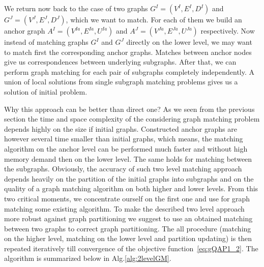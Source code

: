 We return now back to the case of two graphs $G^I=(V^I,E^I,D^I)$ and $G^J=(V^J,E^J,D^J)$, which we want to match. 
For each of them we build an anchor graph $A^I=(V^{Ia},E^{Ia},U^{Ia})$ and $A^J=(V^{Ja},E^{Ja},U^{Ja})$ respectively.
Now instead of matching graphs $G^I$ and $G^J$ directly on the lower level, we may want to match first the corresponding anchor graphs. Matches between anchor nodes give us correspondences between underlying subgraphs. After that, we can perform graph matching for each pair of subgraphs completely independently. A union of local solutions from single subgraph matching problems gives us a solution of initial problem. 

Why this approach can be better than direct one? As we seen from the previous section the time and space complexity of the considering graph matching problem depends highly on the size if initial graphs. Constructed anchor graphs are however several time smaller than initial graphs, which means, the matching algorithm on the anchor level can be performed much faster and without high memory demand then on the lower level. The same holds for matching between the subgraphs.
Obviously, the accuracy of such two level matching approach depends heavily on the partition of the initial graphs into subgraphs and on the quality of a graph matching algorithm on both higher and lower levels. From this two critical moments, we concentrate ourself on the first one and use for graph matching some existing algorithm. To make the described two level approach more robust against graph partitioning we suggest to use an obtained matching between two graphs to correct graph partitioning. The all procedure (matching on the higher level, matching on the lower level and partition updating) is then repeated iteratively till convergence of the objective function~\eqref{eq:gQAP1_2}. The algorithm is summarized below in Alg.\ref{alg:2levelGM}.

